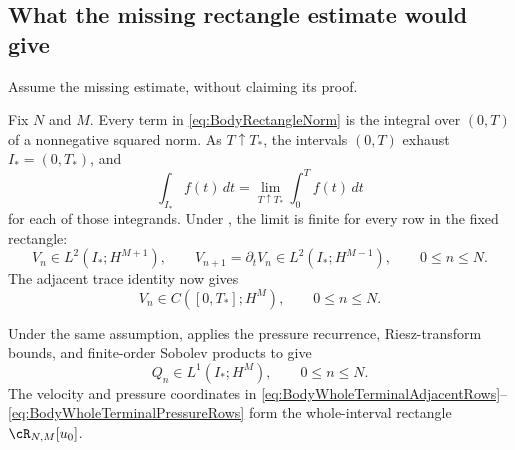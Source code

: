 \subsection{What the missing rectangle estimate would give}\label{sub:BodyCompatibleIntersection}

Assume the missing estimate, without claiming its proof.

Fix \(N\) and \(M\).
Every term in \eqref{eq:BodyRectangleNorm} is the integral over \((0,T)\) of a nonnegative squared norm.
As \(T\uparrow T_*\), the intervals \((0,T)\) exhaust \(I_*=(0,T_*)\), and
\[
  \int_{I_*}f(t)\,dt
  =
  \lim_{T\uparrow T_*}\int_0^T f(t)\,dt
\]
for each of those integrands.
Under , the limit is finite for every row in the fixed rectangle:
\begin{equation}\label{eq:BodyWholeTerminalAdjacentRows}
  V_n\in L^2(I_*;H^{M+1}),
  \qquad
  V_{n+1}=\partial_tV_n\in L^2(I_*;H^{M-1}),
  \qquad 0\leq n\leq N.
\end{equation}
The adjacent trace identity now gives
\begin{equation}\label{eq:BodyWholeTerminalMiddleTraces}
  V_n\in C([0,T_*];H^M),
  \qquad 0\leq n\leq N.
\end{equation}

Under the same assumption,  applies the pressure recurrence, Riesz-transform bounds, and finite-order Sobolev products to give
\begin{equation}\label{eq:BodyWholeTerminalPressureRows}
  Q_n\in L^1(I_*;H^M),
  \qquad 0\leq n\leq N.
\end{equation}
The velocity and pressure coordinates in
\eqref{eq:BodyWholeTerminalAdjacentRows}--\eqref{eq:BodyWholeTerminalPressureRows}
form the whole-interval rectangle \(\cR_{N,M}[u_0]\).

